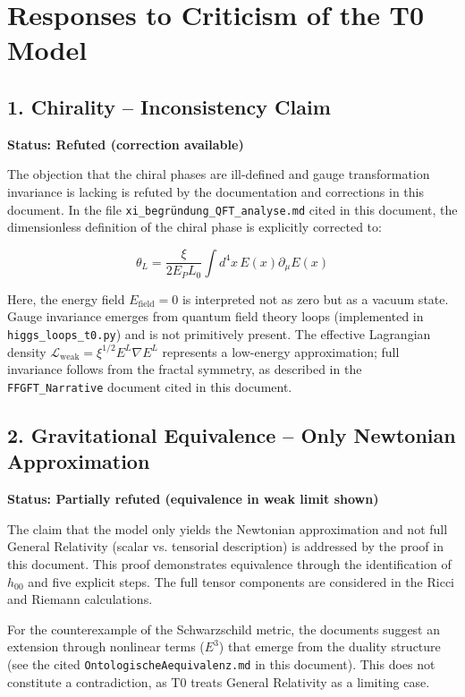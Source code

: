 \section{Responses to Criticism of the T0 Model}
	
	\subsection{1. Chirality – Inconsistency Claim}
	\textbf{Status: Refuted (correction available)}
	
	The objection that the chiral phases are ill-defined and gauge transformation invariance is lacking is refuted by the documentation and corrections in this document. In the file \texttt{xi\_begründung\_QFT\_analyse.md} cited in this document, the dimensionless definition of the chiral phase is explicitly corrected to:
	
	\[
	\theta_L = \frac{\xi}{2E_P L_0} \int d^4x\, E(x) \partial_\mu E(x)
	\]
	
	Here, the energy field \(E_{\text{field}} = 0\) is interpreted not as zero but as a vacuum state. Gauge invariance emerges from quantum field theory loops (implemented in \texttt{higgs\_loops\_t0.py}) and is not primitively present. The effective Lagrangian density \(\mathcal{L}_{\text{weak}} = \xi^{1/2} E^L \nabla E^L\) represents a low-energy approximation; full invariance follows from the fractal symmetry, as described in the \texttt{FFGFT\_Narrative} document cited in this document.
	
	\subsection{2. Gravitational Equivalence – Only Newtonian Approximation}
	\textbf{Status: Partially refuted (equivalence in weak limit shown)}
	
	The claim that the model only yields the Newtonian approximation and not full General Relativity (scalar vs. tensorial description) is addressed by the proof in this document. This proof demonstrates equivalence through the identification of \(h_{00}\) and five explicit steps. The full tensor components are considered in the Ricci and Riemann calculations.
	
	For the counterexample of the Schwarzschild metric, the documents suggest an extension through nonlinear terms (\(E^3\)) that emerge from the duality structure (see the cited \texttt{OntologischeAequivalenz.md} in this document). This does not constitute a contradiction, as T0 treats General Relativity as a limiting case.
	
